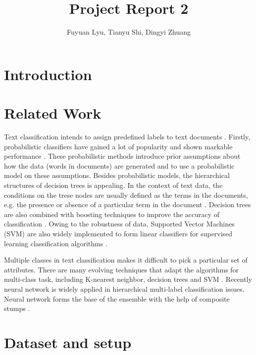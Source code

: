 \documentclass[11pt]{scrartcl}
\title{Project Report 2}
\author{Fuyuan Lyu, Tianyu Shi, Dingyi Zhuang}
\begin{document}
\maketitle

\begin{abstract}

\end{abstract}

\section{Introduction}

\section{Related Work}
Text classification intends to assign predefined labels to text documents \cite{allahyari2017brief,thangaraj2018text}. Firstly, probabilistic classifiers have gained a lot of popularity and shown markable performance \cite{chakrabarti1997using,joachims1996probabilistic,koller1997hierarchically,larkey1996combining}. These probabilistic methods introduce prior assumptions about how the data (words in documents) are generated and to use a probabilistic model on these assumptions. Besides probabilistic models, the hierarchical structures of decision trees is appealing. In the context of text data, the conditions on the trese nodes are usually defined as the terms in the documents, e.g. the presence or absence of a particular term in the document \cite{breiman1984classification,duda2012pattern}. Decision trees are also combined with boosting techniques to improve the accuracy of classification \cite{freund1995desicion,schapire2000boostexter}. Owing to the robustness of data, Supported Vector Machines (SVM) are also widely implemented to form linear classifiers for supervised learning classification algorithms \cite{joachims1998text,joachims2001statistical}.

Multiple classes in text classification makes it difficult to pick a particular set of attributes. There are many evolving techniques that adapt the algorithms for multi-class task, including K-nearest neighbor, decision trees and SVM \cite{tang2016multi,yi2011multi}. Recently neural network is widely applied in hierarchical multi-label classification issues. Neural network forms the base of the ensemble with the help of composite stumps \cite{nie2015neural,cerri2014hierarchical}.
\section{Dataset and setup}
\end{document}
